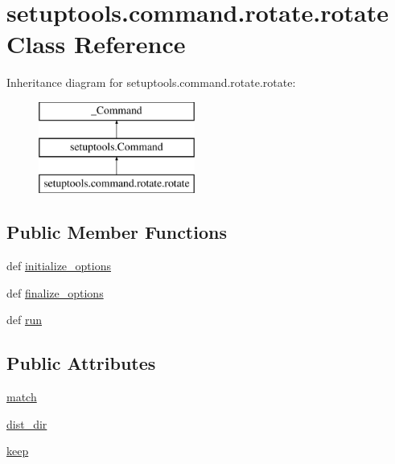 \hypertarget{classsetuptools_1_1command_1_1rotate_1_1rotate}{}\section{setuptools.\+command.\+rotate.\+rotate Class Reference}
\label{classsetuptools_1_1command_1_1rotate_1_1rotate}
Inheritance diagram for setuptools.\+command.\+rotate.\+rotate\+:\begin{figure}[H]
\begin{center}
\leavevmode
\includegraphics[height=3.000000cm]{classsetuptools_1_1command_1_1rotate_1_1rotate}
\end{center}
\end{figure}
\subsection*{Public Member Functions}
\begin{DoxyCompactItemize}
\item 
def \hyperlink{classsetuptools_1_1command_1_1rotate_1_1rotate_ab51ae3786fceda5ca449aa93284831f2}{initialize\+\_\+options}
\item 
def \hyperlink{classsetuptools_1_1command_1_1rotate_1_1rotate_a0b6c3af54a485f77bdb27fdfacf4b014}{finalize\+\_\+options}
\item 
def \hyperlink{classsetuptools_1_1command_1_1rotate_1_1rotate_a64296e9ccd07b5a5e464ab9df7e6b53e}{run}
\end{DoxyCompactItemize}
\subsection*{Public Attributes}
\begin{DoxyCompactItemize}
\item 
\hyperlink{classsetuptools_1_1command_1_1rotate_1_1rotate_aad28873ea7841e9e3a363080894c3c31}{match}
\item 
\hyperlink{classsetuptools_1_1command_1_1rotate_1_1rotate_aca12ffc1c06ceed3253ca385f11d5e40}{dist\+\_\+dir}
\item 
\hyperlink{classsetuptools_1_1command_1_1rotate_1_1rotate_a5d5aeaa431c28bf2504ae02606f40342}{keep}
\end{DoxyCompactItemize}
